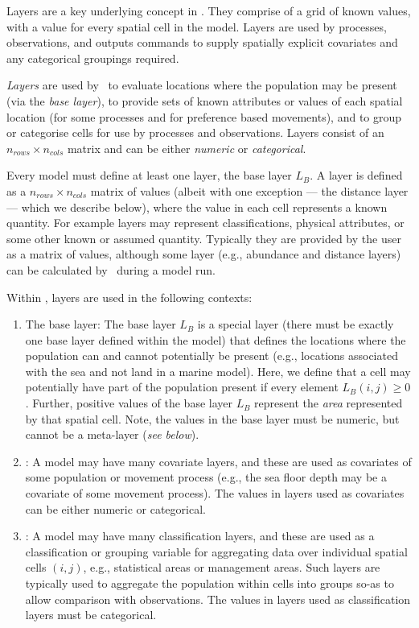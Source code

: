 Layers are a key underlying concept in \SPM. They comprise of a grid of known values, with a value for every spatial cell in the model. Layers are used by processes, observations, and outputs commands to supply spatially explicit covariates and any categorical groupings required. 

\emph{Layers} are used by \SPM\ to evaluate locations where the population may be present (via the \emph{base layer}), to provide sets of known attributes or values of each spatial location (for some processes and for preference based movements), and to group or categorise cells for use by processes and observations. Layers consist of an $n_{rows} \times n_{cols}$ matrix and can be either \emph{numeric} or \emph{categorical}. 

Every model must define at least one layer, the base layer $L_B$. A layer is defined as a $n_{rows} \times n_{cols}$ matrix of values (albeit with one exception --- the distance layer --- which we describe below), where the value in each cell represents a known quantity. For example layers may represent classifications, physical attributes, or some other known or assumed quantity. Typically they are provided by the user as a matrix of values, although some layer (e.g., abundance and distance layers) can be calculated by \SPM\ during a model run. 

Within \SPM, layers are used in the following contexts:
\begin{enumerate}
\item The base layer: The base layer $L_B$ is a special layer (there must be exactly one base layer defined within the model) that defines the locations where the population can and cannot potentially be present (e.g., locations associated with the sea and not land in a marine model). Here, we define that a cell may potentially have part of the population present if every element $L_B(i,j) \ge 0$. Further, positive values of the base layer $L_B$ represent the \emph{area} represented by that spatial cell. Note, the values in the base layer must be numeric, but cannot be a meta-layer (\emph{see below}).
\item {}: A model may have many covariate layers, and these are used as covariates of some population or movement process (e.g., the sea floor depth may be a covariate of some movement process). The values in layers used as covariates can be either numeric or categorical.
\item {}: A model may have many classification layers, and these are used as a classification or grouping variable for aggregating data over individual spatial cells $(i,j)$, e.g., statistical areas or management areas. Such layers are typically used to aggregate the population within cells into groups so-as to allow comparison with observations. The values in layers used as classification layers must be categorical.
\end{enumerate}


